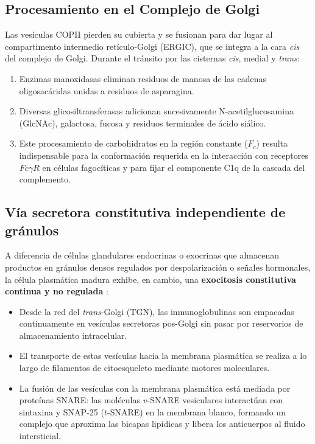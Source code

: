 \subsection{Procesamiento en el Complejo de Golgi}
Las vesículas COPII pierden su cubierta y se fusionan para dar lugar al compartimento intermedio retículo-Golgi (ERGIC), que se integra a la cara \emph{cis} del complejo de Golgi. Durante el tránsito por las cisternas \emph{cis}, medial y \emph{trans}:
\begin{enumerate}
	\item Enzimas manoxidasas eliminan residuos de manosa de las cadenas oligosacáridas unidas a residuos de asparagina.
	\item Diversas glicosiltransferasas adicionan sucesivamente N-acetilglucosamina (GlcNAc), galactosa, fucosa y residuos terminales de ácido siálico.
	\item Este procesamiento de carbohidratos en la región constante ($F_c$) resulta indispensable para la conformación requerida en la interacción con receptores $Fc\gamma R$ en células fagocíticas y para fijar el componente C1q de la cascada del complemento.
\end{enumerate}

\subsection{Vía secretora constitutiva independiente de gránulos}
A diferencia de células glandulares endocrinas o exocrinas que almacenan productos en gránulos densos regulados por despolarización o señales hormonales, la célula plasmática madura exhibe, en cambio, una \textbf{exocitosis constitutiva continua y no regulada} \parencite{alberts2022molecular}:
\begin{itemize}
	\item Desde la red del \emph{trans}-Golgi (TGN), las inmunoglobulinas son empacadas continuamente en vesículas secretoras pos-Golgi sin pasar por reservorios de almacenamiento intracelular.
	\item El transporte de estas vesículas hacia la membrana plasmática se realiza a lo largo de filamentos de citoesqueleto mediante motores moleculares.
	\item La fusión de las vesículas con la membrana plasmática está mediada por proteínas SNARE: las moléculas $v$-SNARE vesiculares interactúan con sintaxina y SNAP-25 ($t$-SNARE) en la membrana blanco, formando un complejo que aproxima las bicapas lipídicas y libera los anticuerpos al fluido intersticial.
\end{itemize}

